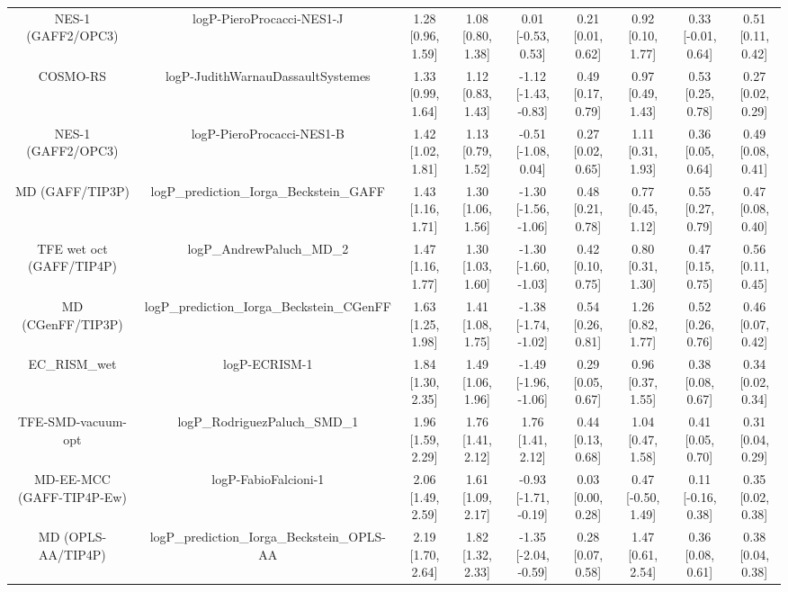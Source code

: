 \documentclass{article}
\begin{document}
\begin{center}
\begin{longtable}{|ccccccccc|}
           NES-1 (GAFF2/OPC3) &                      logP-PieroProcacci-NES1-J &  1.28 [0.96, 1.59] &  1.08 [0.80, 1.38] &    0.01 [-0.53, 0.53] &  0.21 [0.01, 0.62] &     0.92 [0.10, 1.77] &    0.33 [-0.01, 0.64] &     0.51 [0.11, 0.42] \\
                     COSMO-RS &              logP-JudithWarnauDassaultSystemes &  1.33 [0.99, 1.64] &  1.12 [0.83, 1.43] &  -1.12 [-1.43, -0.83] &  0.49 [0.17, 0.79] &     0.97 [0.49, 1.43] &     0.53 [0.25, 0.78] &     0.27 [0.02, 0.29] \\
           NES-1 (GAFF2/OPC3) &                      logP-PieroProcacci-NES1-B &  1.42 [1.02, 1.81] &  1.13 [0.79, 1.52] &   -0.51 [-1.08, 0.04] &  0.27 [0.02, 0.65] &     1.11 [0.31, 1.93] &     0.36 [0.05, 0.64] &     0.49 [0.08, 0.41] \\
              MD (GAFF/TIP3P) &       logP\_prediction\_Iorga\_Beckstein\_GAFF &  1.43 [1.16, 1.71] &  1.30 [1.06, 1.56] &  -1.30 [-1.56, -1.06] &  0.48 [0.21, 0.78] &     0.77 [0.45, 1.12] &     0.55 [0.27, 0.79] &     0.47 [0.08, 0.40] \\
     TFE wet oct (GAFF/TIP4P) &                      logP\_AndrewPaluch\_MD\_2 &  1.47 [1.16, 1.77] &  1.30 [1.03, 1.60] &  -1.30 [-1.60, -1.03] &  0.42 [0.10, 0.75] &     0.80 [0.31, 1.30] &     0.47 [0.15, 0.75] &     0.56 [0.11, 0.45] \\
            MD (CGenFF/TIP3P) &     logP\_prediction\_Iorga\_Beckstein\_CGenFF &  1.63 [1.25, 1.98] &  1.41 [1.08, 1.75] &  -1.38 [-1.74, -1.02] &  0.54 [0.26, 0.81] &     1.26 [0.82, 1.77] &     0.52 [0.26, 0.76] &     0.46 [0.07, 0.42] \\
                  EC_RISM_wet &                                  logP-ECRISM-1 &  1.84 [1.30, 2.35] &  1.49 [1.06, 1.96] &  -1.49 [-1.96, -1.06] &  0.29 [0.05, 0.67] &     0.96 [0.37, 1.55] &     0.38 [0.08, 0.67] &     0.34 [0.02, 0.34] \\
           TFE-SMD-vacuum-opt &                  logP\_RodriguezPaluch\_SMD\_1 &  1.96 [1.59, 2.29] &  1.76 [1.41, 2.12] &     1.76 [1.41, 2.12] &  0.44 [0.13, 0.68] &     1.04 [0.47, 1.58] &     0.41 [0.05, 0.70] &     0.31 [0.04, 0.29] \\
    MD-EE-MCC (GAFF-TIP4P-Ew) &                           logP-FabioFalcioni-1 &  2.06 [1.49, 2.59] &  1.61 [1.09, 2.17] &  -0.93 [-1.71, -0.19] &  0.03 [0.00, 0.28] &    0.47 [-0.50, 1.49] &    0.11 [-0.16, 0.38] &     0.35 [0.02, 0.38] \\
           MD (OPLS-AA/TIP4P) &    logP\_prediction\_Iorga\_Beckstein\_OPLS-AA &  2.19 [1.70, 2.64] &  1.82 [1.32, 2.33] &  -1.35 [-2.04, -0.59] &  0.28 [0.07, 0.58] &     1.47 [0.61, 2.54] &     0.36 [0.08, 0.61] &     0.38 [0.04, 0.38] \\

\end{longtable}
\end{center}
\end{document}
